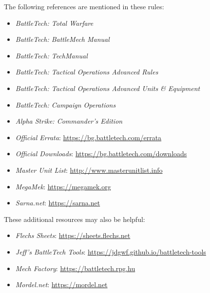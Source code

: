 The following references are mentioned in these rules:

\begin{itemize}

\item \emph{BattleTech: Total Warfare}

\item \emph{BattleTech: BattleMech Manual}

\item \emph{BattleTech: TechManual}

\item \emph{BattleTech: Tactical Operations Advanced Rules}

\item \emph{BattleTech: Tactical Operations Advanced Units \& Equipment}

\item \emph{BattleTech: Campaign Operations}

\item \emph{Alpha Strike: Commander's Edition}

\item \emph{Official Errata}: \href{https://bg.battletech.com/errata}{https://bg.battletech.com/errata}

\item \emph{Official Downloads}: \href{https://bg.battletech.com/downloads}{https://bg.battletech.com/downloads}

\item \emph{Master Unit List}: \href{http://www.masterunitlist.info}{http://www.masterunitlist.info}

\item \emph{MegaMek}: \href{https://megamek.org}{https://megamek.org}

\item \emph{Sarna.net}: \href{https://sarna.net}{https://sarna.net}

\end{itemize}

These additional resources may also be helpful:

\begin{itemize}

\item \emph{Flechs Sheets}: \href{https://sheets.flechs.net}{https://sheets.flechs.net}

\item \emph{Jeff's BattleTech Tools}: \href{https://jdgwf.github.io/battletech-tools}{https://jdgwf.github.io/battletech-tools}

\item \emph{Mech Factory}: \href{https://battletech.rpg.hu}{https://battletech.rpg.hu}

\item \emph{Mordel.net}: \href{https://mordel.net}{https://mordel.net}

\end{itemize}

